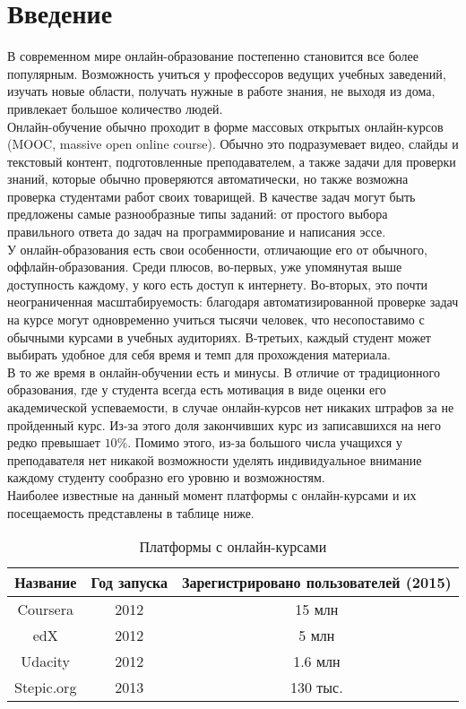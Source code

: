 \documentclass[14pt]{matmex-diploma}
\begin{document}
\section*{Введение}
В современном мире онлайн-образование постепенно становится все более популярным. Возможность учиться у профессоров ведущих учебных заведений, изучать новые области, получать нужные в работе знания, не выходя из дома, привлекает большое количество людей. 
\\\indent Онлайн-обучение обычно проходит в форме массовых открытых онлайн-курсов (MOOC, massive open online course). Обычно это подразумевает видео, слайды и текстовый контент, подготовленные преподавателем, а также задачи для проверки знаний, которые обычно проверяются автоматически, но также возможна проверка студентами работ своих товарищей. В качестве задач могут быть предложены самые разнообразные типы заданий: от простого выбора правильного ответа до задач на программирование и написания эссе.
\\\indent У онлайн-образования есть свои особенности, отличающие его от обычного, оффлайн-образования. Среди плюсов, во-первых, уже упомянутая выше доступность каждому, у кого есть доступ к интернету. Во-вторых, это почти неограниченная масштабируемость: благодаря автоматизированной проверке задач на курсе могут одновременно учиться тысячи человек, что несопоставимо с обычными курсами в учебных аудиториях. В-третьих, каждый студент может выбирать удобное для себя время и темп для прохождения материала.
\\\indent В то же время в онлайн-обучении есть и минусы. В отличие от традиционного образования, где у студента всегда есть мотивация в виде оценки его академической успеваемости, в случае онлайн-курсов нет никаких штрафов за не пройденный курс. Из-за этого доля закончивших курс из записавшихся на него редко превышает $10\%$. Помимо этого, из-за большого числа учащихся у преподавателя нет никакой возможности уделять индивидуальное внимание каждому студенту сообразно его уровню и возможностям.
\\\indent Наиболее известные на данный момент платформы с онлайн-курсами и их посещаемость представлены в таблице ниже.

\begin{table}[H]
\caption{Платформы с онлайн-курсами}
\label{tabular:statistic}
\begin{center}
\begin{tabular}{c|c|c}
\hline
Название & Год запуска & Зарегистрировано пользователей (2015) \\
\hline
Coursera\cite{coursera} & 2012 & 15 млн \\
edX\cite{edx} & 2012 & 5 млн \\
Udacity\cite{udacity} & 2012 & 1.6 млн \\
Stepic.org\cite{stepic} & 2013 & 130 тыс. \\

\end{tabular}
\end{center}
\end{table}
\end{document}

